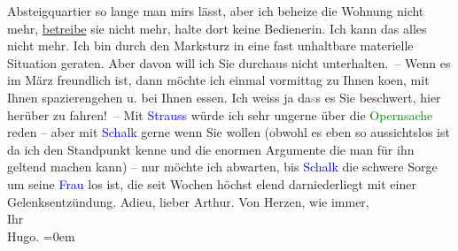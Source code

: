                     Absteigquartier so lange man mirs lässt, aber ich beheize die Wohnung nicht
                    mehr, \uline{betreibe} sie nicht mehr, halte dort keine
                    Bedienerin. Ich kann das alles nicht mehr. Ich bin durch den Marksturz in eine
                    fast unhaltbare materielle Situation geraten. Aber davon will {\pb}ich Sie durchaus nicht
                    unterhalten. – Wenn es im März freundlich ist, dann möchte ich
                    einmal vormittag zu Ihnen ko{\geminationm}en, mit Ihnen
                    spazierengehen u. bei Ihnen essen. Ich weiss ja da\textcolor{gray}{s}s es Sie beschwert, hier
                    herüber zu fahren! –\pend
           \pstart
           Mit \textcolor{blue}{Strauss}{}\ledrightnote{\textcolor{blue}{Richard Strauss}} würde ich sehr ungerne über die
                        \textcolor{green}{Opernsache}{} reden – aber
                    mit \textcolor{blue}{Schalk}{}\ledrightnote{\textcolor{blue}{Franz Schalk}} gerne wenn Sie wollen (obwohl es
                    eben so aussichtslos ist da ich den Standpunkt kenne und die enormen Argumente
                    die man für ihn geltend machen kann) – nur möchte ich abwarten, bis \textcolor{blue}{Schalk}{}\ledrightnote{\textcolor{blue}{Franz Schalk}} die schwere Sorge um seine \textcolor{blue}{Frau}{} los ist, die seit
                    Wochen höchst elend darniederliegt mit einer Gelenksentzündung.\pend
           \pstart
           Adieu, lieber Arthur.\pend
           \pstart
           Von Herzen, wie immer,{\\[\baselineskip]}Ihr{\\[\baselineskip]}\spacefill\mbox{Hugo.}\pend
           \leftskip=0em{}\endnumbering{}  
      